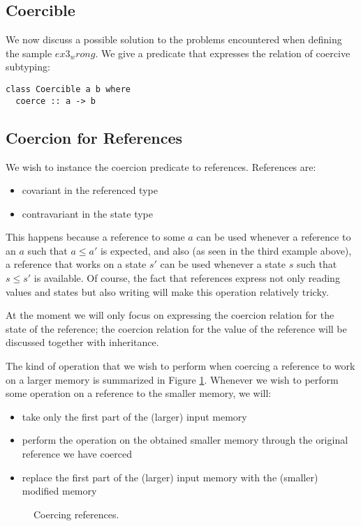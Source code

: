 \subsection{Coercible}
We now discuss a possible solution to the problems encountered when defining the sample $ex3_wrong$. We give a predicate that expresses the relation of coercive subtyping:
\begin{lstlisting}
class Coercible a b where
  coerce :: a -> b
\end{lstlisting}

\subsection{Coercion for References}
We wish to instance the coercion predicate to references. References are:
\begin{itemize}
\item covariant in the referenced type
\item contravariant in the state type
\end{itemize}
This happens because a reference to some $a$ can be used whenever a reference to an $a$ such that $a \le a'$ is expected, and also (as seen in the third example above), a reference that works on a state $s'$ can be used whenever a state $s$ such that $s \le s'$ is available. Of course, the fact that references express not only reading values and states but also writing will make this operation relatively tricky.

At the moment we will only focus on expressing the coercion relation for the state of the reference; the coercion relation for the value of the reference will be discussed together with inheritance.

The kind of operation that we wish to perform when coercing a reference to work on a larger memory is summarized in Figure \ref{fig:ref_coerce}. Whenever we wish to perform some operation on a reference to the smaller memory, we will:
\begin{itemize}
\item take only the first part of the (larger) input memory 
\item perform the operation on the obtained smaller memory through the original reference we have coerced
\item replace the first part of the (larger) input memory with the (smaller) modified memory
\end{itemize}

\begin{figure}[h]
\centerline{} \caption{Coercing references.\label{fig:ref_coerce}}
\end{figure}

